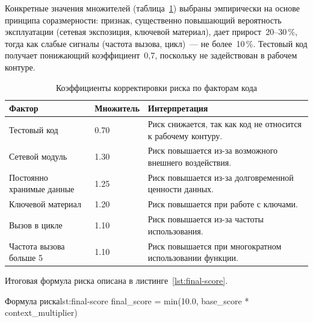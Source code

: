 \documentclass{itmo-vkr}
\begin{document}
Конкретные значения множителей (таблица~\ref{tab:factors}) выбраны эмпирически на основе принципа соразмерности: признак, существенно повышающий вероятность эксплуатации (сетевая экспозиция, ключевой материал), дает прирост~20--30\,\%, тогда как слабые сигналы (частота вызова, цикл)~--- не более~10\,\%. Тестовый код получает понижающий коэффициент~0,7, поскольку не задействован в рабочем контуре.

\begin{longtable}{|p{4cm}|p{3cm}|p{8cm}|}
	\caption{Коэффициенты корректировки риска по факторам кода} \label{tab:factors} \\
	\hline
	Фактор & Множитель & Интерпретация \\ \hline
	
	\hspace{0pt}Тестовый код & 0.70 & \hspace{0pt}Риск снижается, так как код не относится к рабочему контуру. \\ \hline
	\hspace{0pt}Сетевой модуль & 1.30 & \hspace{0pt}Риск повышается из-за возможного внешнего воздействия. \\ \hline
	\hspace{0pt}Постоянно хранимые данные & 1.25 & \hspace{0pt}Риск повышается из-за долговременной ценности данных. \\ \hline
	\hspace{0pt}Ключевой материал & 1.20 & \hspace{0pt}Риск повышается при работе с ключами. \\ \hline
	\hspace{0pt}Вызов в цикле & 1.10 & \hspace{0pt}Риск повышается из-за частоты использования. \\ \hline
	\hspace{0pt}Частота вызова больше 5 & 1.10 & \hspace{0pt}Риск повышается при многократном использовании функции. \\
	\hline
\end{longtable}

Итоговая формула риска описана в листинге~\ref{lst:final-score}.


\begin{itmolisting}[C++]{Формула риска}{lst:final-score}
final_score = min(10.0, base_score * context_multiplier)
\end{itmolisting}
\end{document}

